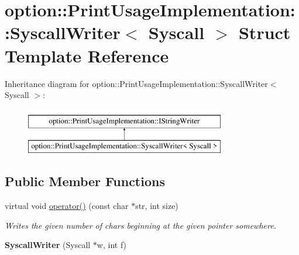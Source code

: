 \hypertarget{structoption_1_1_print_usage_implementation_1_1_syscall_writer}{}\section{option\+:\+:Print\+Usage\+Implementation\+:\+:Syscall\+Writer$<$ Syscall $>$ Struct Template Reference}
\label{structoption_1_1_print_usage_implementation_1_1_syscall_writer}
Inheritance diagram for option\+:\+:Print\+Usage\+Implementation\+:\+:Syscall\+Writer$<$ Syscall $>$\+:\begin{figure}[H]
\begin{center}
\leavevmode
\includegraphics[height=2.000000cm]{structoption_1_1_print_usage_implementation_1_1_syscall_writer}
\end{center}
\end{figure}
\subsection*{Public Member Functions}
\begin{DoxyCompactItemize}
\item 
\mbox{\label{structoption_1_1_print_usage_implementation_1_1_syscall_writer_a61c1c010d9b67affd5f1208f0a3e9cf0}} 
virtual void \hyperlink{structoption_1_1_print_usage_implementation_1_1_syscall_writer_a61c1c010d9b67affd5f1208f0a3e9cf0}{operator()} (const char $\ast$str, int size)
\begin{DoxyCompactList}\small\item\em Writes the given number of chars beginning at the given pointer somewhere. \end{DoxyCompactList}\item 
\mbox{\label{structoption_1_1_print_usage_implementation_1_1_syscall_writer_ae4f8677dbd79b0a9238368e28014701a}} 
{\bfseries Syscall\+Writer} (Syscall $\ast$w, int f)
\end{DoxyCompactItemize}
